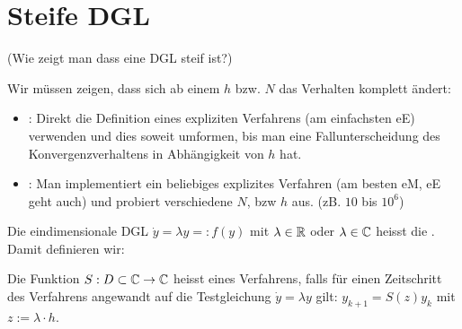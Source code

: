 \section{Steife DGL}

\vspace{1\baselineskip}


\vspace{1\baselineskip}

(Wie zeigt man dass eine DGL steif ist?)

Wir müssen zeigen, dass sich ab einem $h$ bzw. $N$ das Verhalten komplett ändert:
\begin{itemize}
    \item {}: Direkt die Definition eines expliziten Verfahrens
        (am einfachsten eE) verwenden und dies soweit umformen, bis man eine
        Fallunterscheidung des Konvergenzverhaltens in Abhängigkeit von $h$ hat.
    \item {}: Man implementiert ein beliebiges explizites Verfahren
        (am besten eM, eE geht auch) und probiert verschiedene $N$, bzw $h$ aus.
        (zB. $10$ bis $10^6$)
\end{itemize}

\vspace{1\baselineskip}

\underline{}

\vspace{1\baselineskip}


Die eindimensionale DGL $\dot{y} = \lambda y =: f(y)$ mit $\lambda \in \mathbb{R}$ oder
$\lambda \in \mathbb{C}$ heisst die . Damit definieren wir:

\vspace{1\baselineskip}


Die Funktion $S: D \subset \mathbb{C} \rightarrow \mathbb{C}$ heisst  eines
Verfahrens, falls für einen Zeitschritt des Verfahrens angewandt auf die Testgleichung
$\dot{y} = \lambda y$ gilt: $y_{k+1} = S(z) y_k$ mit $z := \lambda \cdot h$.

\vspace{1\baselineskip}

